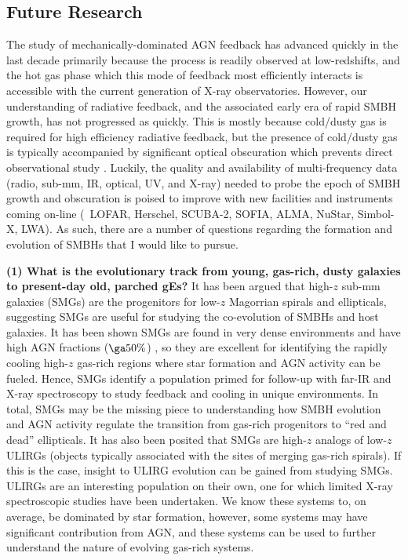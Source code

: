 \documentclass[12pt]{article}
\begin{document}
\subsection*{Future Research}
The study of mechanically-dominated AGN feedback has advanced quickly
in the last decade primarily because the process is readily observed
at low-redshifts, and the hot gas phase which this mode of feedback
most efficiently interacts is accessible with the current generation
of X-ray observatories. However, our understanding of radiative
feedback, and the associated early era of rapid SMBH growth, has not
progressed as quickly. This is mostly because cold/dusty gas is
required for high efficiency radiative feedback, but the presence of
cold/dusty gas is typically accompanied by significant optical
obscuration which prevents direct observational study
\cite{2009arXiv0911.3911A}. Luckily, the quality and availability
of multi-frequency data (radio, sub-mm, IR, optical, UV, and X-ray)
needed to probe the epoch of SMBH growth and obscuration is poised to
improve with new facilities and instruments coming on-line (\ie\
LOFAR, Herschel, SCUBA-2, SOFIA, ALMA, NuStar, Simbol-X, LWA). As such,
there are a number of questions regarding the formation and evolution
of SMBHs that I would like to pursue.


{\bf{(1) What is the evolutionary track from young, gas-rich, dusty
galaxies to present-day old, parched gEs?}} It has been argued that
high-$z$ sub-mm galaxies (SMGs) are the progenitors for low-$z$
Magorrian spirals and ellipticals, suggesting SMGs are useful for
studying the co-evolution of SMBHs and host galaxies. It has been
shown SMGs are found in very dense environments and have high AGN
fractions ($\ga 50\%$) \cite{2005ApJ...632..736A}, so they are
excellent for identifying the rapidly cooling high-$z$ gas-rich
regions where star formation and AGN activity can be fueled. Hence,
SMGs identify a population primed for follow-up with far-IR and X-ray
spectroscopy to study feedback and cooling in unique environments. In
total, SMGs may be the missing piece to understanding how SMBH
evolution and AGN activity regulate the transition from gas-rich
progenitors to ``red and dead'' ellipticals. It has also been posited
that SMGs are high-$z$ analogs of low-$z$ ULIRGs (objects typically
associated with the sites of merging gas-rich spirals). If this is the
case, insight to ULIRG evolution can be gained from studying
SMGs. ULIRGs are an interesting population on their own, one for which
limited X-ray spectroscopic studies have been undertaken. We know
these systems to, on average, be dominated by star formation, however,
some systems may have significant contribution from AGN, and these
systems can be used to further understand the nature of evolving
gas-rich systems.
\end{document}
